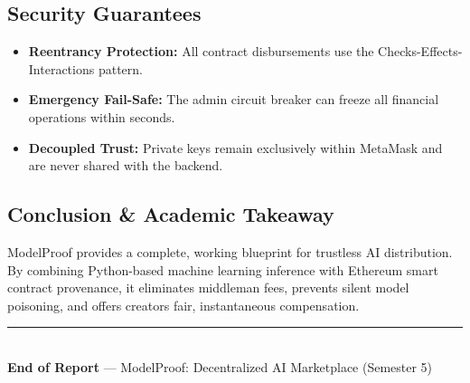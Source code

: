 \documentclass[11pt,a4paper]{article}
\begin{document}
\subsection{Security Guarantees}
\begin{itemize}[leftmargin=1.5em]
    \item \textbf{Reentrancy Protection:} All contract disbursements use the Checks-Effects-Interactions pattern.
    \item \textbf{Emergency Fail-Safe:} The admin circuit breaker can freeze all financial operations within seconds.
    \item \textbf{Decoupled Trust:} Private keys remain exclusively within MetaMask and are never shared with the backend.
\end{itemize}

\subsection{Conclusion \& Academic Takeaway}
ModelProof provides a complete, working blueprint for trustless AI distribution. By combining Python-based machine learning inference with Ethereum smart contract provenance, it eliminates middleman fees, prevents silent model poisoning, and offers creators fair, instantaneous compensation.

\vspace{0.4cm}
\begin{center}
    \rule{0.6\linewidth}{0.8pt}\\[0.15cm]
    \textbf{End of Report} --- ModelProof: Decentralized AI Marketplace (Semester 5)
\end{center}
\end{document}
